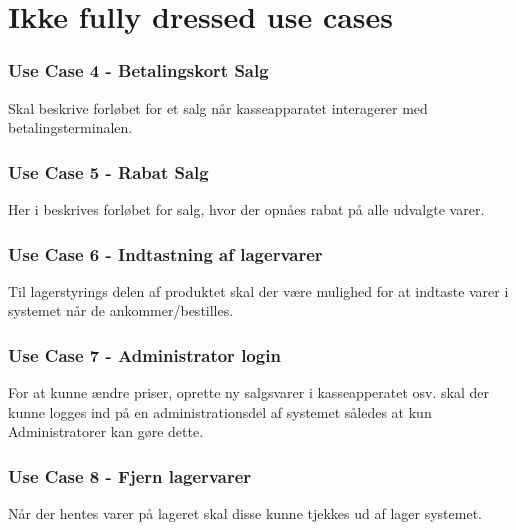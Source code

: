 \section{Ikke fully dressed use cases}

\subsubsection*{Use Case 4 - Betalingskort Salg}
Skal beskrive forløbet for et salg når kasseapparatet interagerer med betalingsterminalen.

\subsubsection*{Use Case 5 - Rabat Salg}
Her i beskrives forløbet for salg, hvor der opnåes rabat på alle udvalgte varer.

\subsubsection*{Use Case 6 - Indtastning af lagervarer}
Til lagerstyrings delen af produktet skal der være mulighed for at indtaste varer i systemet når de ankommer/bestilles.

\subsubsection*{Use Case 7 - Administrator login}
For at kunne ændre priser, oprette ny salgsvarer i kasseapperatet osv. skal der kunne logges ind på en administrationsdel af systemet således at kun Administratorer kan gøre dette.

\subsubsection*{Use Case 8 - Fjern lagervarer}
Når der hentes varer på lageret skal disse kunne tjekkes ud af lager systemet.



